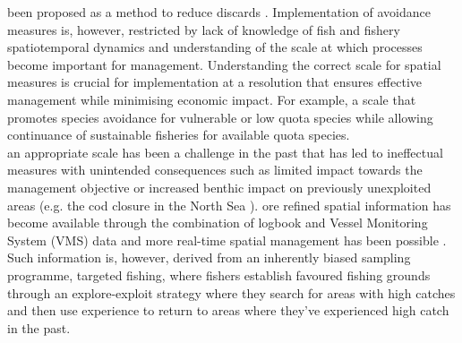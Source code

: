 \documentclass[review]{elsarticle}
\begin{document}
 been proposed as a method to reduce discards
.  
Implementation of avoidance measures is, however, restricted by lack of
knowledge of fish and fishery spatiotemporal dynamics and understanding of the
scale at which processes become important for management. Understanding the
correct scale for spatial measures is crucial for implementation at a
resolution that ensures effective management \citep{Dunn2016} while minimising
economic impact.  For example, a scale that promotes species avoidance for
vulnerable or low quota species while allowing continuance of sustainable
fisheries for available quota species.\\

 an
appropriate scale has been a challenge in the past that has led to ineffectual
measures with unintended consequences such as limited impact towards the
management objective or increased benthic impact on previously unexploited
areas (e.g. the cod closure in the North Sea
\citep{Rijnsdorp2001,Dinmore2003}). ore
refined spatial information has  become available through
the combination of logbook and Vessel Monitoring System (VMS) data
\citep{Lee2010, Bastardie2010, Gerritsen2012, Mateo2016} and more real-time
spatial management has been possible \citep[e.g.][]{Holmes2011}.  Such
information is, however, derived from an inherently biased sampling programme,
targeted fishing, where fishers establish favoured fishing grounds through an
explore-exploit strategy \citep{Bailey2018} where they search for areas with
high catches and then use experience to return to areas where they've
experienced high catch in the past.  \\ 

\end{document}
